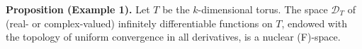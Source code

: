 \textbf{Proposition (Example 1).} Let $T$ be the $k$-dimensional torus. The space $\mathcal{D}_T$ of (real- or complex-valued) infinitely differentiable functions on $T$, endowed with the topology of uniform convergence in all derivatives, is a nuclear (F)-space.
